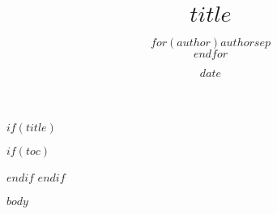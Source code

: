 \documentclass[11pt]{article}
\title{$title$}
\author{$for(author)$$author$$sep$\\$endfor$}
\date{$date$}
\begin{document}
$if(title)$
\maketitle
$if(toc)$
\listoffigures
\tableofcontents
\newpage
$endif$
$endif$

$body$
\end{document}
